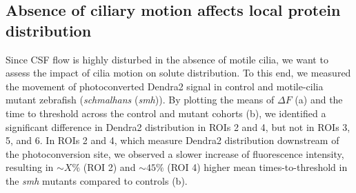 \documentclass[fleqn]{wlscirep}
\begin{document}

\subsection*{Absence of ciliary motion affects local protein distribution}
Since CSF flow is highly disturbed in the absence of motile cilia, we
want to assess the impact of cilia motion on solute distribution. To this end,
we measured the movement of photoconverted Dendra2 signal
in control and motile-cilia mutant zebrafish (\emph{schmalhans} (\emph{smh})).
By plotting the means of $\Delta F$ (a)
and the time to threshold
across the control and mutant cohorts (b),
we identified a significant
difference in Dendra2 distribution in ROIs 2 and 4, but not in ROIs 3, 5, and 6. In ROIs 2 and 4,
which measure Dendra2 distribution downstream of the photoconversion site,
we observed a slower increase of fluorescence intensity,
resulting in $\sim X\%$ (ROI 2) and $\sim 45\%$ (ROI 4)
higher mean times-to-threshold in the \emph{smh}
mutants compared to controls (b). 
\end{document}
